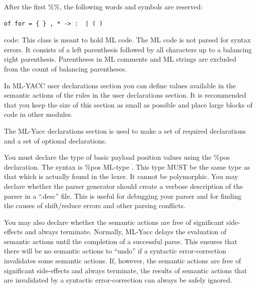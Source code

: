 \documentclass[8pt, a4paper, oneside, twocolumn]{extarticle}
\begin{document}
After the first \%\%, the following words and symbols are reserved:
\begin{verbatim}
of for = { } , * -> :  | ( )
\end{verbatim}

code:
This  class  is  meant  to  hold  ML  code.   The  ML  code  is  not  parsed  for  syntax
errors.  It consists of a left parenthesis followed by all characters up to a balancing
right parenthesis.  Parentheses in ML comments and ML strings are excluded from
the count of balancing parentheses.

In ML-YACC user declarations section you can define values available in the semantic actions of the rules in the user declarations  section.   It  is  recommended  that  you  keep  the  size  of  this  section  as  small  as
possible and place large blocks of code in other modules.

The  ML-Yacc  declarations  section  is  used  to  make  a  set  of  required  declarations  and
a set of optional declarations.  

You must declare the type of basic payload position values using the
\%pos
declaration.
The syntax is
\%pos
ML-type
. This type MUST be the same type as that which is actually
found in the lexer.  It cannot be polymorphic.
You may declare whether the parser generator should create a verbose description of the parser in a “.desc” file. This  is  useful  for  debugging  your  parser  and  for  finding  the
causes of shift/reduce errors and other parsing conflicts.

You may also declare whether the semantic actions are free of significant side-effects
and  always  terminate.   Normally,  ML-Yacc  delays  the  evaluation  of  semantic  actions
until the completion of a successful parse.  This ensures that there will be no semantic
actions to “undo” if a syntactic error-correction invalidates some semantic actions.  If,
however, the semantic actions are free of significant side-effects and always terminate,
the results of semantic actions that are invalidated by a syntactic error-correction can
always be safely ignored.
\end{document}
